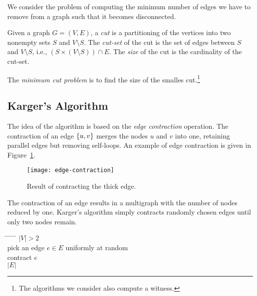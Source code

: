 
We consider the problem of computing the minimum number of edges we have to
remove from a graph such that it becomes disconnected.

\begin{definition}[Cut]
  Given a graph $G=(V,E)$, a \emph{cut} is a partitioning of the vertices into
  two nonempty sets $S$ and $V \setminus S$.
  The \emph{cut-set} of the cut is the set of edges between $S$ and
  $V \setminus S$, i.e., $(S \times (V \setminus S)) \cap E$.
  The \emph{size} of the cut is the cardinality of the cut-set.
\end{definition}

The \emph{minimum cut problem} is to find the size of the smalles
cut.\footnote{The algorithms we consider also compute a witness.}

\subsection{Karger's Algorithm}

The idea of the algorithm is based on the \emph{edge contraction} operation.
The contraction of an edge $\{u,v\}$ merges the nodes $u$ and $v$ into one,
retaining parallel edges but removing self-loops.
An example of edge contraction is given in Figure~\ref{fig:edge-contraction}.

\begin{figure}[h]
  \centering
  \texttt{[image: edge-contraction]}
  \caption{Result of contracting the thick edge.}
  \label{fig:edge-contraction}
\end{figure}

The contraction of an edge results in a multigraph with the number of nodes
reduced by one.
Karger's algorithm simply contracts randomly chosen edges until only two nodes
remain.

\begin{tabbing}
\hspace*{.25in} \= \hspace*{.25in} \= \hspace*{.25in} \= \hspace*{.25in} \= \hspace*{.25in} \=\kill
{} $|V| > 2$ \\
\>\> pick an edge $e \in E$ uniformly at random \\
\>\> contract $e$ \\
 $|E|$
\end{tabbing}

